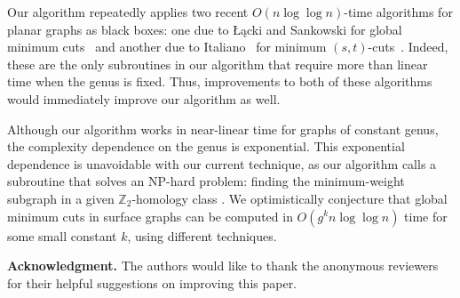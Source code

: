 \documentclass[twoside,leqno,twocolumn]{article}
\def\Z{\mathbb{Z}}
\def\paragraph#1{\par\medskip\noindent\textbf{#1}}
\begin{document}
Our algorithm repeatedly applies two recent $O(n\log\log n)$-time algorithms for planar graphs as black boxes: one due to Łącki and Sankowski for global minimum cuts~\cite{ls-mcsc-11} and another due to  Italiano \etal~for minimum $(s,t)$-cuts~\cite{insw-iamcmf-11}.  Indeed, these are the only subroutines in our algorithm that require more than linear time when the genus is fixed.  Thus, improvements to both of these algorithms would immediately improve our algorithm as well.

Although our algorithm works in near-linear time for graphs of constant genus, the complexity dependence on the genus is exponential.  This exponential dependence is unavoidable with our current technique, as our algorithm calls a subroutine that solves an NP-hard problem: finding the minimum-weight subgraph in a given $\Z_2$-homology class \cite{cen-mcshc-09}.  We optimistically conjecture that global minimum cuts in surface graphs can be computed in $O(g^k n \log\log n)$ time for some small constant $k$, using different techniques.

\medskip
\paragraph{Acknowledgment.} The authors would like to thank the anonymous
reviewers for their helpful suggestions on improving this paper.



\end{document}
